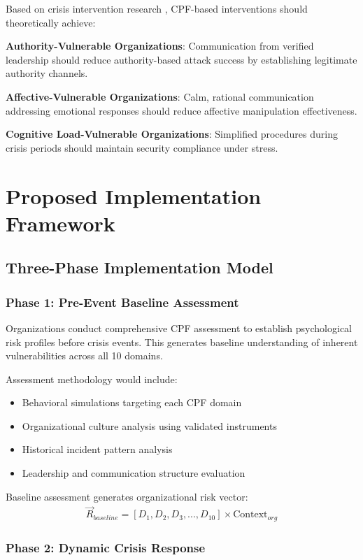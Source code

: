 \documentclass[11pt,a4paper]{article}
\begin{document}
Based on crisis intervention research \cite{roberts2005}, CPF-based interventions should theoretically achieve:

\textbf{Authority-Vulnerable Organizations}: Communication from verified leadership should reduce authority-based attack success by establishing legitimate authority channels.

\textbf{Affective-Vulnerable Organizations}: Calm, rational communication addressing emotional responses should reduce affective manipulation effectiveness.

\textbf{Cognitive Load-Vulnerable Organizations}: Simplified procedures during crisis periods should maintain security compliance under stress.

\section{Proposed Implementation Framework}

\subsection{Three-Phase Implementation Model}

\subsubsection{Phase 1: Pre-Event Baseline Assessment}

Organizations conduct comprehensive CPF assessment to establish psychological risk profiles before crisis events. This generates baseline understanding of inherent vulnerabilities across all 10 domains.

Assessment methodology would include:
\begin{itemize}
\item Behavioral simulations targeting each CPF domain
\item Organizational culture analysis using validated instruments
\item Historical incident pattern analysis
\item Leadership and communication structure evaluation
\end{itemize}

Baseline assessment generates organizational risk vector:
\begin{align}
\vec{R}_{baseline} = [D_1, D_2, D_3, ..., D_{10}] \times \text{Context}_{org}
\end{align}

\subsubsection{Phase 2: Dynamic Crisis Response}
\end{document}
